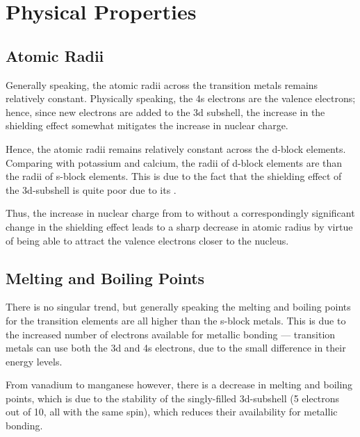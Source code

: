 



	\section{Physical Properties}

		\subsection{Atomic Radii}

			Generally speaking, the atomic radii across the transition metals remains relatively constant. Physically speaking, the 4s electrons
			are the valence electrons; hence, since new electrons are added to the 3d subshell, the increase in the shielding effect
			somewhat mitigates the increase in nuclear charge.




			Hence, the atomic radii remains relatively constant across the d-block elements. Comparing with potassium and calcium,
			the radii of d-block elements are  than the radii of s-block elements. This is due to the fact that the shielding
			effect of the 3d-subshell is quite poor due to its .

			Thus, the increase in nuclear charge from  to  without a correspondingly significant change in the shielding effect
			leads to a sharp decrease in atomic radius by virtue of being able to attract the valence electrons closer to the nucleus.



		\subsection{Melting and Boiling Points}

			There is no singular trend, but generally speaking the melting and boiling points for the transition elements are all higher
			than the s-block metals. This is due to the increased number of electrons available for metallic bonding --- transition
			metals can use both the 3d and 4s electrons, due to the small difference in their energy levels.

			From vanadium to manganese however, there is a decrease in melting and boiling points, which is due to the stability of the
			singly-filled 3d-subshell (5 electrons out of 10, all with the same spin), which reduces their availability for metallic bonding.

